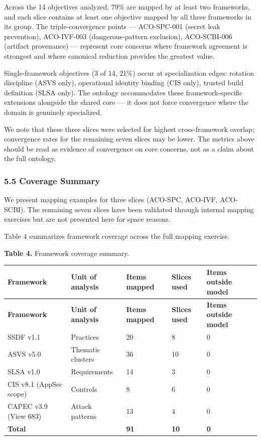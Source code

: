 \documentclass[
]{article}
\begin{document}
Across the 14 objectives analyzed, 79\% are mapped by at least two
frameworks, and each slice contains at least one objective mapped by all
three frameworks in its group. The triple-convergence points ---
ACO-SPC-001 (secret leak prevention), ACO-IVF-003 (dangerous-pattern
exclusion), ACO-SCBI-006 (artifact provenance) --- represent core
concerns where framework agreement is strongest and where canonical
reduction provides the greatest value.

Single-framework objectives (3 of 14, 21\%) occur at specialization
edges: rotation discipline (ASVS only), operational identity binding
(CIS only), trusted build definition (SLSA only). The ontology
accommodates these framework-specific extensions alongside the shared
core --- it does not force convergence where the domain is genuinely
specialized.

We note that these three slices were selected for highest
cross-framework overlap; convergence rates for the remaining seven
slices may be lower. The metrics above should be read as evidence of
convergence on core concerns, not as a claim about the full ontology.

\subsubsection{5.5 Coverage Summary}\label{coverage-summary}

We present mapping examples for three slices (ACO-SPC, ACO-IVF,
ACO-SCBI). The remaining seven slices have been validated through
internal mapping exercises but are not presented here for space reasons.

Table 4 summarizes framework coverage across the full mapping exercise.

\textbf{Table 4.} Framework coverage summary.

\begin{longtable}{@{}L{3.55cm}L{3.15cm}C{2cm}C{1.8cm}C{2.05cm}@{}}
\toprule
\textbf{Framework} & \textbf{Unit of analysis} & \textbf{Items mapped} & \textbf{Slices used} & \textbf{Items outside model} \\
\midrule
\endfirsthead
\toprule
\textbf{Framework} & \textbf{Unit of analysis} & \textbf{Items mapped} & \textbf{Slices used} & \textbf{Items outside model} \\
\midrule
\endhead
\bottomrule
\endfoot
\bottomrule
\endlastfoot
SSDF v1.1 & Practices & 20 & 8 & 0 \\
ASVS v5.0 & Thematic clusters & 36 & 10 & 0 \\
SLSA v1.0 & Requirements & 14 & 3 & 0 \\
CIS v8.1 (AppSec scope) & Controls & 8 & 6 & 0 \\
CAPEC v3.9 (View 683) & Attack patterns & 13 & 4 & 0 \\
\textbf{Total} &  & \textbf{91} & \textbf{10} & \textbf{0} \\
\end{longtable}
\end{document}
